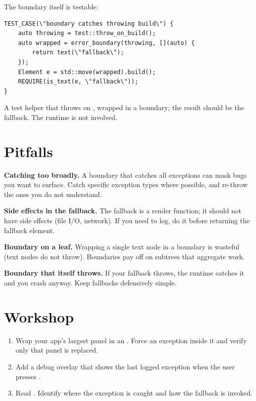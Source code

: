 The boundary itself is testable:

\begin{lstlisting}
TEST_CASE(\"boundary catches throwing build\") {
    auto throwing = test::throw_on_build();
    auto wrapped = error_boundary(throwing, [](auto) {
        return text(\"fallback\");
    });
    Element e = std::move(wrapped).build();
    REQUIRE(is_text(e, \"fallback\"));
}
\end{lstlisting}

A test helper that throws on , wrapped in a
boundary; the result should be the fallback. The runtime is
not involved.

\section{Pitfalls}

\begin{warning}
\textbf{Catching too broadly.} A boundary that catches all
exceptions can mask bugs you want to surface. Catch specific
exception types where possible, and re-throw the ones you do not
understand.
\end{warning}

\begin{warning}
\textbf{Side effects in the fallback.} The fallback is a render
function; it should not have side effects (file I/O, network).
If you need to log, do it before returning the fallback element.
\end{warning}

\begin{warning}
\textbf{Boundary on a leaf.} Wrapping a single text node in a
boundary is wasteful (text nodes do not throw). Boundaries pay
off on subtrees that aggregate work.
\end{warning}

\begin{warning}
\textbf{Boundary that itself throws.} If your fallback throws,
the runtime catches it and you crash anyway. Keep fallbacks
defensively simple.
\end{warning}

\section*{Workshop}

\begin{enumerate}[leftmargin=*]
  \item Wrap your app's largest panel in an
    . Force an exception inside it and
    verify only that panel is replaced.
  \item Add a debug overlay that shows the last logged
    exception when the user presses .
  \item Read
    . Identify
    where the exception is caught and how the fallback is
    invoked.
\end{enumerate}

